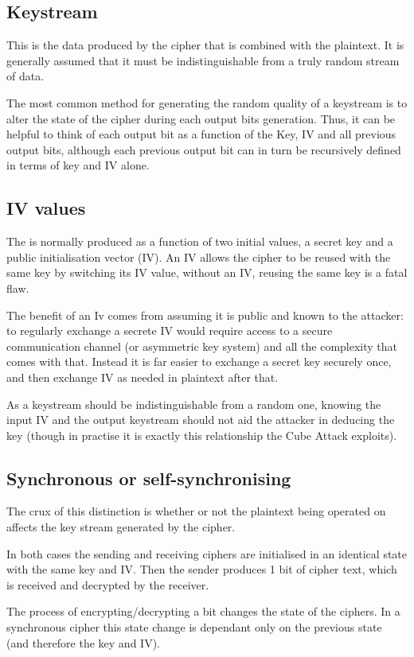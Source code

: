 \documentclass{report}
\let\Oldsubsection\subsection
\renewcommand{\subsection}{\FloatBarrier\Oldsubsection}
\begin{document}
\subsection{Keystream}
This is the data produced by the cipher that is combined with the plaintext. It is generally assumed that it must be indistinguishable from a truly random stream of data.

The most common method %
for generating the random quality of a keystream is to alter the state of the cipher during each output bits generation. Thus, it can be helpful to think of each output bit as a function of the Key, IV and all previous output bits, although each previous output bit can in turn be recursively defined in terms of key and IV alone.

\subsection*{IV values}
The is normally produced as a function of two initial values, a secret key and a public initialisation vector (IV). An IV allows the cipher to be reused with the same key by switching its IV value, without an IV, reusing the same key is a fatal flaw.

The benefit of an Iv comes from assuming it is public and known to the attacker: to regularly exchange a secrete IV would require access to a secure communication channel (or asymmetric key system) and all the complexity that comes with that. Instead it is far easier to exchange a secret key securely once, and then exchange IV as needed in plaintext after that.

As a keystream should be indistinguishable from a random one, knowing the input IV and the output keystream should not aid the attacker in deducing the key (though in practise it is exactly this relationship the Cube Attack exploits).

\subsection{Synchronous or self-synchronising}
The crux of this distinction is whether or not the plaintext being operated on affects the key stream generated by the cipher.

In both cases the sending and receiving ciphers are initialised in an identical state with the same key and IV. Then the sender produces 1 bit of cipher text, which is received and decrypted by the receiver.

The process of encrypting/decrypting a bit changes the state of the ciphers. In a synchronous cipher this state change is dependant only on the previous state (and therefore the key and IV).
\end{document}
